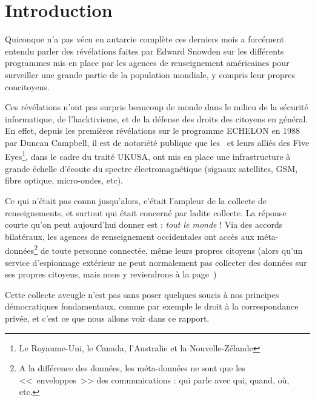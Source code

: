 \chapter{Introduction}
\label{ch:intro}

Quiconque n'a pas vécu en autarcie complète ces derniers
mois a forcément entendu parler des révélations faites par Edward Snowden sur les
différents programmes mis en place par les agences de renseignement américaines
pour surveiller une grande partie de la population mondiale, y compris leur
propres concitoyens.\newline

Ces révélations n'ont pas surpris beaucoup de monde dans le milieu
de la sécurité informatique, de l'hacktivisme, et de la défense des droits des
citoyens en général. En effet, depuis les premières révélations sur le
programme ECHELON en 1988 par Duncan Campbell\cite{Campbell1988}, il est de
notoriété publique que les \EUA~et leurs alliés des Five Eyes\footnote{Le
Royaume-Uni, le Canada, l’Australie et la Nouvelle-Zélande}, dans le cadre du
traité UKUSA, ont mis en place une infrastructure à grande échelle d'écoute du
spectre électromagnétique (signaux satellites, GSM, fibre optique, micro-ondes,
etc).\newline

Ce qui n'était pas connu jusqu'alors, c'était l'ampleur de la
collecte de renseignements, et surtout qui était concerné par ladite collecte.
La réponse courte qu'on peut aujourd'hui donner est : \emph{tout le monde} ! Via
des accords bilatéraux, les agences de renseignement occidentales ont accès aux
méta-données\footnote{A la différence des données, les méta-données ne
sont que les <<~enveloppes~>> des communications : qui parle avec qui,
quand, où, etc.} de toute personne connectée, même leurs propres citoyens
(alors qu'un service d'espionnage extérieur ne peut normalement pas collecter
des données sur ses propres citoyens, mais nous y reviendrons à la
page~\pageref{impact})\newline

Cette collecte aveugle n'est pas sans poser quelques soucis à nos
principes démocratiques fondamentaux, comme par exemple le droit à la correspondance
privée\citep{CEDH}, et c'est ce que nous allons voir dans ce rapport.
